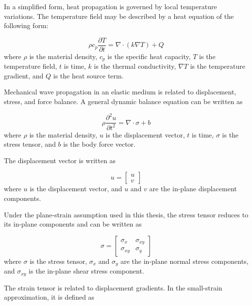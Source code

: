 In a simplified form, heat propagation is governed by local temperature variations. The temperature field may be described by a heat equation of the following form:

\begin{equation}
\rho c_p
\frac{\partial T}{\partial t}
=
\nabla \cdot
\left(
k \nabla T
\right)
+
Q
\end{equation}
where \(\rho\) is the material density, \(c_p\) is the specific heat capacity, \(T\) is the temperature field, \(t\) is time, \(k\) is the thermal conductivity, \(\nabla T\) is the temperature gradient, and \(Q\) is the heat source term.

Mechanical wave propagation in an elastic medium is related to displacement, stress, and force balance. A general dynamic balance equation can be written as

\begin{equation}
\rho
\frac{\partial^2 u}{\partial t^2}
=
\nabla \cdot \sigma
+
b
\end{equation}
where \(\rho\) is the material density, \(u\) is the displacement vector, \(t\) is time, \(\sigma\) is the stress tensor, and \(b\) is the body force vector.

The displacement vector is written as

\begin{equation}
u
=
\begin{bmatrix}
u \\
v
\end{bmatrix}
\end{equation}
where \(u\) is the displacement vector, and \(u\) and \(v\) are the in-plane displacement components.

Under the plane-strain assumption used in this thesis, the stress tensor reduces to its in-plane components and can be written as

\begin{equation}
\sigma
=
\begin{bmatrix}
\sigma_x & \sigma_{xy} \\
\sigma_{xy} & \sigma_y
\end{bmatrix}
\end{equation}
where \(\sigma\) is the stress tensor, \(\sigma_x\) and \(\sigma_y\) are the in-plane normal stress components, and \(\sigma_{xy}\) is the in-plane shear stress component.

The strain tensor is related to displacement gradients. In the small-strain approximation, it is defined as

